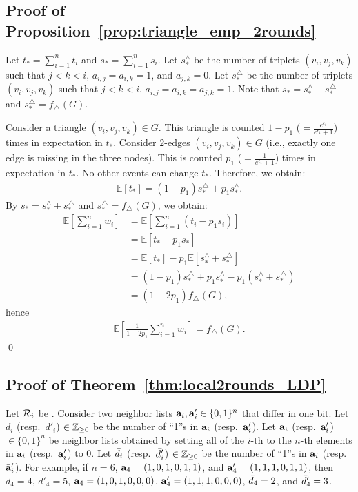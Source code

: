 {\subsection{Proof of Proposition~\ref{prop:triangle_emp_2rounds}}
Let $t_* = \sum_{i=1}^n t_i$ and $s_* = \sum_{i=1}^n s_i$. 
Let $s_*^{\wedge}$ be the number of triplets $(v_i,v_j,v_k)$ such that $j<k<i$, $a_{i,j} = a_{i,k} = 1$, and $a_{j,k} = 0$. 
Let $s_*^{\triangle}$ be the number of triplets $(v_i,v_j,v_k)$ such that $j<k<i$, $a_{i,j} = a_{i,k} = a_{j,k} =1$. 
Note that 
$s_* = s_*^{\wedge} + s_*^{\triangle}$ and 
$s_*^{\triangle} = f_\triangle(G)$. 

Consider a triangle $(v_i,v_j,v_k) \in G$. 
This triangle is counted $1-p_1$ ($= \frac{e^{\epsilon_1}}{e^{\epsilon_1}+1}$) times in expectation in $t_*$. 
Consider $2$-edges $(v_i,v_j,v_k) \in G$ (i.e., exactly one edge is missing in the three nodes). 
This is counted $p_1$ ($= \frac{1}{e^{\epsilon_1}+1}$) times in expectation in $t_*$.  
No other events can change $t_*$. 
Therefore, we obtain:
\begin{align*}
\mathbb{E}[t_*] = (1-p_1) s_*^{\triangle} + p_1 s_*^{\wedge}. 
\end{align*}
By $s_* = s_*^{\wedge} + s_*^{\triangle}$ and 
$s_*^{\triangle} = f_\triangle(G)$, we obtain:
\begin{align*}
\mathbb{E}\left[\sum_{i=1}^n w_i \right] 
&= \mathbb{E}\left[\sum_{i=1}^n (t_i - p_1 s_i) \right] \\
&= \mathbb{E}[t_* - p_1 s_*] \\
&= \mathbb{E}[t_*] - p_1 \mathbb{E}[s_*^{\wedge} + s_*^{\triangle}] \\
&= (1-p_1) s_*^{\triangle} + p_1 s_*^{\wedge} - p_1 (s_*^{\wedge} + s_*^{\triangle}) \\
&= (1 - 2 p_1) f_\triangle(G),
\end{align*}
hence 
\begin{align*}
\textstyle{\mathbb{E}\left[ \frac{1}{1-2p_1} \sum_{i=1}^n w_i \right] = f_\triangle(G).}
\end{align*}
\qed

\subsection{Proof of Theorem~\ref{thm:local2rounds_LDP}}
Let $\mathcal{R}_i$ be . 
Consider two neighbor lists $\mathbf{a}_i,\mathbf{a}'_i \in \{0,1\}^n$ that differ in one bit. 
Let $d_i$ (resp.~$d'_i$) $\in \mathbb{Z}_{\ge0}$ be the number of ``1''s in $\mathbf{a}_i$ (resp.~$\mathbf{a}'_i$). 
Let $\bar{\mathbf{a}}_i$ (resp.~$\bar{\mathbf{a}}'_i$) $\in \{0,1\}^n$ be neighbor lists obtained by setting all of the $i$-th to the $n$-th elements in $\mathbf{a}_i$ (resp.~$\mathbf{a}'_i$) to $0$. 
Let $\bar{d}_i$ (resp.~$\bar{d}'_i$) $\in \mathbb{Z}_{\ge0}$ be the number of ``1''s in $\bar{\mathbf{a}}_i$ (resp.~$\bar{\mathbf{a}}'_i$). 
For example, if $n=6$, $\mathbf{a}_4=(1,0,1,0,1,1)$, and $\mathbf{a}'_4=(1,1,1,0,1,1)$, then 
$d_4=4$, $d'_4=5$, $\bar{\mathbf{a}}_4=(1,0,1,0,0,0)$, $\bar{\mathbf{a}}'_4=(1,1,1,0,0,0)$, $\bar{d}_4=2$, and $\bar{d}'_4=3$. 

}
